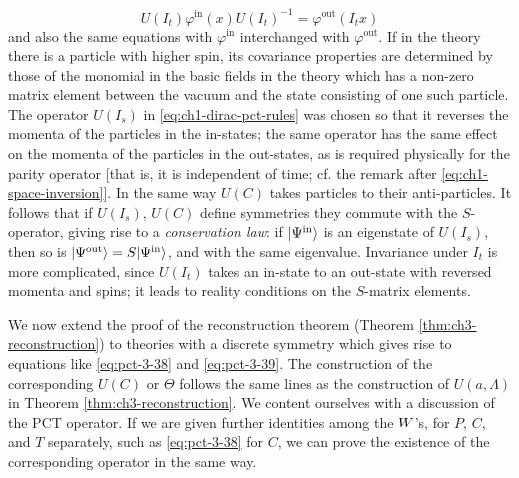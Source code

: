 \begin{equation*}
  U(I_t)\varphi^{\mathrm{in}}(x)U(I_t)^{-1}
  =\varphi^{\mathrm{out}}(I_tx)
\end{equation*}
and also the same equations with $\varphi^{\mathrm{in}}$ interchanged with
$\varphi^{\mathrm{out}}$.  If in the theory there is a particle with higher
spin, its covariance properties are determined by those of the monomial in
the basic fields in the theory which has a non-zero matrix element between the
vacuum and the state consisting of one such particle.  The operator $U(I_s)$
in \eqref{eq:ch1-dirac-pct-rules} was chosen so that it reverses the momenta of the particles in the
in-states; the same operator has the same effect on the momenta of the
particles in the out-states, as is required physically for the parity operator
[that is, it is independent of time; cf. the remark after \eqref{eq:ch1-space-inversion}].  In the
same way $U(C)$ takes particles to their anti-particles.  It follows that if
$U(I_s)$, $U(C)$ define symmetries they commute with the $S$-operator, giving
rise to a \emph{conservation law}: if $\lvert \Psi^{\mathrm{in}}\rangle$ is an
eigenstate of $U(I_s)$, then so is
$\lvert \Psi^{\mathrm{out}}\rangle=S\lvert \Psi^{\mathrm{in}}\rangle$, and with the same
eigenvalue.  Invariance under $I_t$ is more complicated, since $U(I_t)$
takes an in-state to an out-state with reversed momenta and spins; it leads
to reality conditions on the $S$-matrix elements.

We now extend the proof of the reconstruction theorem (Theorem \ref{thm:ch3-reconstruction}) to
theories with a discrete symmetry which gives rise to equations
like \eqref{eq:pct-3-38} and \eqref{eq:pct-3-39}.  The construction of the corresponding $U(C)$ or
$\Theta$ follows the same lines as the construction of $U(a,\Lambda)$ in
Theorem \ref{thm:ch3-reconstruction}.  We content ourselves with a discussion of the PCT operator.  If
we are given further identities among the $W$'s, for $P$, $C$, and
$T$ separately, such as \eqref{eq:pct-3-38} for $C$, we can prove the existence of the
corresponding operator in the same way.

